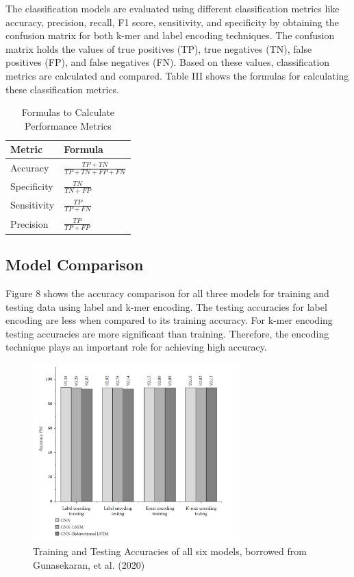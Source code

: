\documentclass[journal]{IEEEtran}
\begin{document}
  The classification models are evaluated using different classification metrics like accuracy, precision, recall, F1 score, sensitivity,
  and specificity by obtaining the confusion matrix for both k-mer and label encoding techniques.
  The confusion matrix holds the values of true positives (TP), true negatives (TN), false positives (FP), and false negatives (FN).
  Based on these values, classification metrics are calculated and compared.
  Table III shows the formulas for calculating these classification metrics.
  \begin{table}
    \caption{\label{tab:table3}Formulas to Calculate Performance Metrics}
    \centering
      \begin{tabular}{ || l l ||}
      \hline
      Metric & Formula \\
      \hline
      \hline
      Accuracy    & $\frac{TP + TN}{TP + TN + FP + FN}$\\
      Specificity & $\frac{TN}{TN + FP}$ \\
      Sensitivity & $\frac{TP}{TP + FN}$ \\
      Precision   & $\frac{TP}{TP + FP}$ \\
      \hline
      \end{tabular}%
  \end{table}

  \subsection{Model Comparison}
    Figure 8 shows the accuracy comparison for all three models for training and testing data using label and k-mer encoding.
    The testing accuracies for label encoding are less when compared to its training accuracy.
    For k-mer encoding testing accuracies are more significant than training.
    Therefore, the encoding technique plays an important role for achieving high accuracy.

    \begin{figure}
      \centering
      \includegraphics[width=8cm]{figures/accuracy.png}
      \caption{Training and Testing Accuracies of all six models, borrowed from Gunasekaran, et al. (2020)}
    \end{figure}
\end{document}
